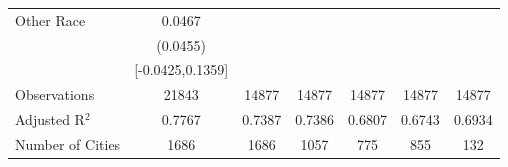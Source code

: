 \documentclass{article}
\begin{document}
\begin{table}[htbp]
\begin{tabular}{l*{6}{c}}
Other Race          &      0.0467   &               &               &               &               &               \\
                    &    (0.0455)   &               &               &               &               &               \\
                    &[-0.0425,0.1359]   &               &               &               &               &               \\
\midrule
Observations        &       21843   &       14877   &       14877   &       14877   &       14877   &       14877   \\
Adjusted R$^2$      &      0.7767   &      0.7387   &      0.7386   &      0.6807   &      0.6743   &      0.6934   \\
Number of Cities    &        1686   &        1686   &        1057   &         775   &         855   &         132   \\
\bottomrule
\end{tabular}
\end{table}
\end{document}

